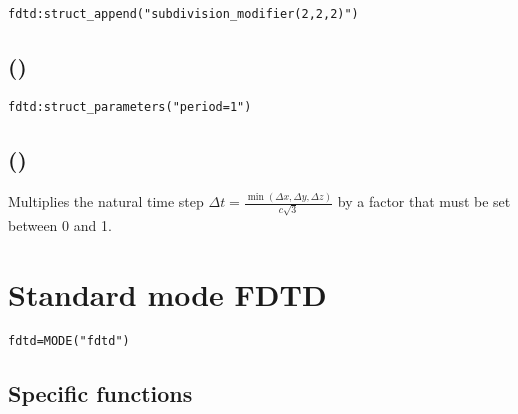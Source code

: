 	\fwarn
\begin{lstlisting}
fdtd:struct_append("subdivision_modifier(2,2,2)")
\end{lstlisting}


\subsection[struct\_parameters]{()}

\fwarn
\begin{lstlisting}
fdtd:struct_parameters("period=1")
\end{lstlisting}


\subsection[time\_mod]{()}

Multiplies the natural time step $\Delta t=\frac{\min(\Delta x,\Delta y,\Delta z)}{c\sqrt{3}}$ by a factor  that must be set between 0 and 1.

\section{Standard mode FDTD}

\fwarn
\begin{lstlisting}
fdtd=MODE("fdtd")
\end{lstlisting}

\subsection{Specific functions}

